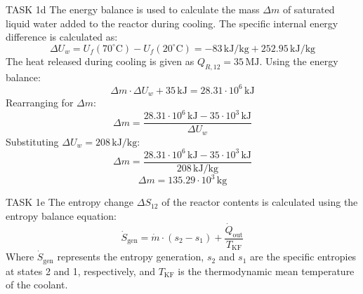 TASK 1d  
The energy balance is used to calculate the mass \( \Delta m \) of saturated liquid water added to the reactor during cooling. The specific internal energy difference is calculated as:  
\[
\Delta U_w = U_f(70^\circ\text{C}) - U_f(20^\circ\text{C}) = -83 \, \text{kJ/kg} + 252.95 \, \text{kJ/kg}
\]  
The heat released during cooling is given as \( Q_{R,12} = 35 \, \text{MJ} \). Using the energy balance:  
\[
\Delta m \cdot \Delta U_w + 35 \, \text{kJ} = 28.31 \cdot 10^6 \, \text{kJ}
\]  
Rearranging for \( \Delta m \):  
\[
\Delta m = \frac{28.31 \cdot 10^6 \, \text{kJ} - 35 \cdot 10^3 \, \text{kJ}}{\Delta U_w}
\]  
Substituting \( \Delta U_w = 208 \, \text{kJ/kg} \):  
\[
\Delta m = \frac{28.31 \cdot 10^6 \, \text{kJ} - 35 \cdot 10^3 \, \text{kJ}}{208 \, \text{kJ/kg}}
\]  
\[
\Delta m = 135.29 \cdot 10^3 \, \text{kg}
\]  

TASK 1e  
The entropy change \( \Delta S_{12} \) of the reactor contents is calculated using the entropy balance equation:  
\[
\dot{S}_{\text{gen}} = \dot{m} \cdot (s_2 - s_1) + \frac{\dot{Q}_{\text{out}}}{T_{\text{KF}}}
\]  
Where \( \dot{S}_{\text{gen}} \) represents the entropy generation, \( s_2 \) and \( s_1 \) are the specific entropies at states 2 and 1, respectively, and \( T_{\text{KF}} \) is the thermodynamic mean temperature of the coolant.